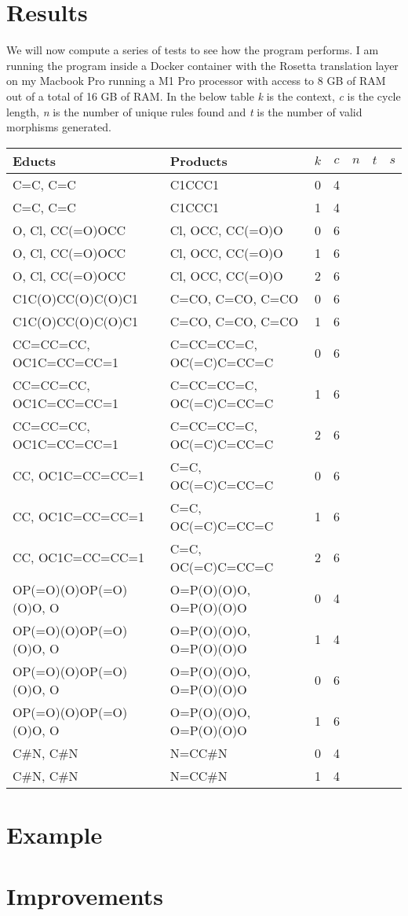 \documentclass{article}
\begin{document}
\section{Results}
We will now compute a series of tests to see how the program performs. I am running the program inside a Docker container with the Rosetta translation layer on my Macbook Pro running a M1 Pro processor with access to 8 GB of RAM out of a total of 16 GB of RAM. In the below table \textit{k} is the context, \textit{c} is the cycle length, \textit{n} is the number of unique rules found and \textit{t} is  the number of valid morphisms generated.
\begin{table}[h]
    \centering
    \begin{tabular}{ll|ccccc}\\
        Educts & Products & $k$ & $c$ & $n$ & $t$ & $s$\\\hline
        C=C, C=C & C1CCC1 & 0 & 4 & & & \\
        C=C, C=C & C1CCC1 & 1 & 4 & & & \\
        O, Cl, CC(=O)OCC & Cl, OCC, CC(=O)O & 0 & 6 & \\
        O, Cl, CC(=O)OCC & Cl, OCC, CC(=O)O & 1 & 6 & \\
        O, Cl, CC(=O)OCC & Cl, OCC, CC(=O)O & 2 & 6 & \\
        C1C(O)CC(O)C(O)C1 & C=CO, C=CO, C=CO  & 0 & 6 & & & \\
        C1C(O)CC(O)C(O)C1 & C=CO, C=CO, C=CO  & 1 & 6 & & & \\
        CC=CC=CC, OC1C=CC=CC=1 & C=CC=CC=C, OC(=C)C=CC=C & 0 & 6 & & & \\
        CC=CC=CC, OC1C=CC=CC=1 & C=CC=CC=C, OC(=C)C=CC=C & 1 & 6 & & & \\
        CC=CC=CC, OC1C=CC=CC=1 & C=CC=CC=C, OC(=C)C=CC=C & 2 & 6 & & & \\
        CC, OC1C=CC=CC=1 & C=C, OC(=C)C=CC=C & 0 & 6 & & & \\
        CC, OC1C=CC=CC=1 & C=C, OC(=C)C=CC=C & 1 & 6 & & & \\
        CC, OC1C=CC=CC=1 & C=C, OC(=C)C=CC=C & 2 & 6 & & & \\
        OP(=O)(O)OP(=O)(O)O, O & O=P(O)(O)O, O=P(O)(O)O  & 0 & 4 & & & \\
        OP(=O)(O)OP(=O)(O)O, O & O=P(O)(O)O, O=P(O)(O)O  & 1 & 4 & & & \\
        OP(=O)(O)OP(=O)(O)O, O & O=P(O)(O)O, O=P(O)(O)O  & 0 & 6 & & & \\
        OP(=O)(O)OP(=O)(O)O, O & O=P(O)(O)O, O=P(O)(O)O  & 1 & 6 & & & \\
        C\#N, C\#N & N=CC\#N & 0 & 4 & & & \\
        C\#N, C\#N & N=CC\#N & 1 & 4 & & & \\
    \end{tabular}
\end{table}
\newpage
\section{Example}

\newpage
\section{Improvements}
\end{document}
